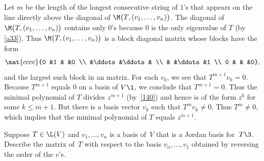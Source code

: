 \begin{Solution}
Let $m$ be the length of the longest consecutive string of $1$'s that appears on the line directly
above the diagonal of $\M\bigl(T, (v_1, \dots, v_n)\bigr)$. The diagonal of
$\M\bigl(T, (v_1, \dots, v_n)\bigr)$ contains only $0$'s because $0$ is the only eigenvalue of $T$ (by \ref{a33}). Thus $\M\bigl(T, (v_1, \dots, v_n)\bigr)$ is a block diagonal matrix
whose blocks have the form
\[
\mat{cccc}{0 &1 & &0 \\
&\ddots &\ddots & \\
& &\ddots &1 \\
0 & & &0},
\]
and the largest such block in an  matrix.  For each $v_k$, we see
that $T^{m+1} v_k = 0$.  Because $T^{m+1}$ equals $0$ on a basis of $V\1$, we conclude
that $T^{m+1} = 0$.  Thus the minimal polynomial of $T$ divides $z^{m+1}$
(by~\ref{140}) and hence is of the form $z^k$ for some $k \le m + 1$.  But there
is a basis vector $v_k$ such that $T^m v_k \ne 0$.  Thus $T^m \ne 0$, which
implies that the minimal polynomial of $T$ equals $z^{m+1}$.
\end{Solution}

\exercise
Suppose $T \in \L(V)$ and $v_1, \dots, v_n$ is a basis of~$V$ that is a Jordan
basis for~$T\3$. Describe the matrix of~$T$ with respect to the basis
$v_n, \dots, v_1$ obtained by reversing the order of the $v$'s.

